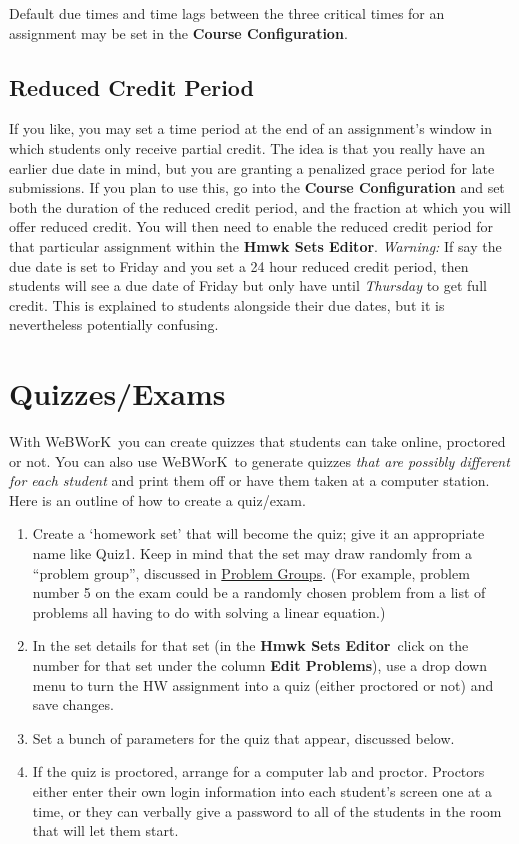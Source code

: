 \documentclass[12pt]{article}
\newcommand{\menu}[1]{\textbf{#1}}
\newcommand{\WW}{WeBWorK}
\newcommand{\HSE}{\menu{Hmwk Sets Editor}}
\begin{document}
Default due times and time lags between the three critical times for an assignment may be set in the \menu{Course Configuration}.

\subsection{Reduced Credit Period}\label{reducedcredit}

If you like, you may set a time period at the end of an assignment's window in which students only receive partial credit. The idea is that you really have an earlier due date in mind, but you are granting a penalized grace period for late submissions. If you plan to use this, go into the \menu{Course Configuration} and set both the duration of the reduced credit period, and the fraction at which you will offer reduced credit. You will then need to enable the reduced credit period for that particular assignment within the \HSE. \emph{Warning:} If say the due date is set to Friday and you set a 24 hour reduced credit period, then students will see a due date of Friday but only have until \emph{Thursday} to get full credit. This is explained to students alongside their due dates, but it is nevertheless potentially confusing. 

\section{Quizzes/Exams}

With \WW\ you can create quizzes that students can take online, proctored or not. You can also use \WW\ to generate quizzes \emph{that are possibly different for each student} and print them off or have them taken at a computer station. Here is an outline of how to create a quiz/exam.
\begin{enumerate}
\item Create a `homework set' that will become the quiz; give it an appropriate name like Quiz1. Keep in mind that the set may draw randomly from a ``problem group'', discussed in \hyperref[groups]{Problem Groups}. (For example, problem number 5 on the exam could be a randomly chosen problem from a list of problems all having to do with solving a linear equation.)
\item In the set details for that set (in the \HSE\ click on the number for that set under the column \menu{Edit Problems}), use a drop down menu to turn the HW assignment into a quiz (either proctored or not) and save changes.
\item Set a bunch of parameters for the quiz that appear, discussed below.
\item If the quiz is proctored, arrange for a computer lab and proctor. Proctors either enter their own login information into each student's screen one at a time, or they can verbally give a password to all of the students in the room that will let them start.
\end{enumerate}
\end{document}

